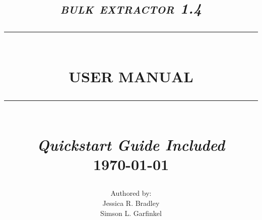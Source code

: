 \begin{titlepage}





%



\newcommand{\TRule}[1]{\rule{\linewidth}{#1}} 	%

\makeatletter							%
\def\printtitle{%
    {\centering \@title\par}}
\makeatother									

\makeatletter							%
\def\printauthor{%
    {\centering \large \@author}}				
\makeatother							

\title{	\LARGE \textsc{\textit{bulk extractor 1.4}} 	%
		 	\\[1.0cm]													%
			\TRule{0.5pt} \\										%
			\LARGE \textbf{\uppercase{User Manual}}	%
			\TRule{2pt} \\ [0.5cm]								%
			\small \textit{Quickstart Guide Included}\\
			\normalsize \today									%
		}
\author{
		Authored by: \\
		Jessica R. Bradley\\
		Simson L. Garfinkel\\		
}

\thispagestyle{empty}				%

\printtitle									%
  	\vfill
\printauthor								%














\end{titlepage}
